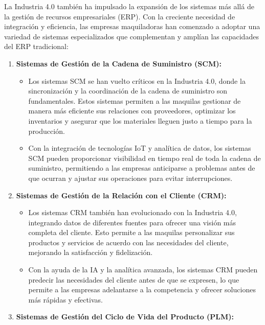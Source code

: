 \documentclass[
  10pt,
  letterpaper,
]{book}
\providecommand{\tightlist}{%
  \setlength{\itemsep}{0pt}\setlength{\parskip}{0pt}}\usepackage{longtable,booktabs,array}
\begin{document}
La Industria 4.0 también ha impulsado la expansión de los sistemas más
allá de la gestión de recursos empresariales (ERP). Con la creciente
necesidad de integración y eficiencia, las empresas maquiladoras han
comenzado a adoptar una variedad de sistemas especializados que
complementan y amplían las capacidades del ERP tradicional:

\begin{enumerate}
\def\labelenumi{\arabic{enumi}.}
\tightlist
\item
  \textbf{Sistemas de Gestión de la Cadena de Suministro (SCM):}

  \begin{itemize}
  \tightlist
  \item
    Los sistemas SCM se han vuelto críticos en la Industria 4.0, donde
    la sincronización y la coordinación de la cadena de suministro son
    fundamentales. Estos sistemas permiten a las maquilas gestionar de
    manera más eficiente sus relaciones con proveedores, optimizar los
    inventarios y asegurar que los materiales lleguen justo a tiempo
    para la producción.
  \item
    Con la integración de tecnologías IoT y analítica de datos, los
    sistemas SCM pueden proporcionar visibilidad en tiempo real de toda
    la cadena de suministro, permitiendo a las empresas anticiparse a
    problemas antes de que ocurran y ajustar sus operaciones para evitar
    interrupciones.
  \end{itemize}
\item
  \textbf{Sistemas de Gestión de la Relación con el Cliente (CRM):}

  \begin{itemize}
  \tightlist
  \item
    Los sistemas CRM también han evolucionado con la Industria 4.0,
    integrando datos de diferentes fuentes para ofrecer una visión más
    completa del cliente. Esto permite a las maquilas personalizar sus
    productos y servicios de acuerdo con las necesidades del cliente,
    mejorando la satisfacción y fidelización.
  \item
    Con la ayuda de la IA y la analítica avanzada, los sistemas CRM
    pueden predecir las necesidades del cliente antes de que se
    expresen, lo que permite a las empresas adelantarse a la competencia
    y ofrecer soluciones más rápidas y efectivas.
  \end{itemize}
\item
  \textbf{Sistemas de Gestión del Ciclo de Vida del Producto (PLM):}


\end{enumerate}
\end{document}
